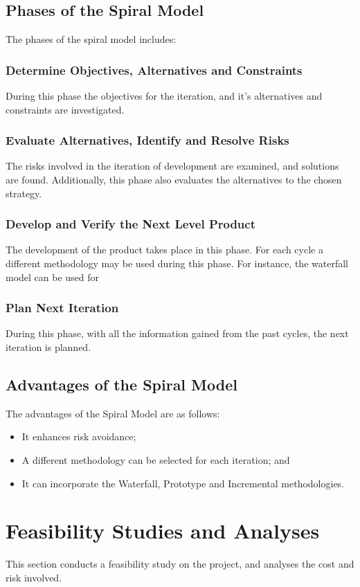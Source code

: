 \subsection{Phases of the Spiral Model}
The phases of the spiral model includes:

\subsubsection{Determine Objectives, Alternatives and Constraints}
During this phase the objectives for the iteration, and it's alternatives and constraints are investigated.

\subsubsection{Evaluate Alternatives, Identify and Resolve Risks}
The risks involved in the iteration of development are examined, and solutions are found. Additionally, this phase also evaluates the alternatives to the chosen strategy.

\subsubsection{Develop and Verify the Next Level Product}
The development of the product takes place in this phase. For each cycle a different methodology may be used during this phase. For instance, the waterfall model can be used for 

\subsubsection{Plan Next Iteration}
During this phase, with all the information gained from the past cycles, the next iteration is planned.

\subsection{Advantages of the Spiral Model}
The advantages of the Spiral Model are as follows:
\begin{itemize}
	\item It enhances risk avoidance;
	\item A different methodology can be selected for each iteration; and 
	\item It can incorporate the Waterfall, Prototype and Incremental methodologies.
\end{itemize}

\section{Feasibility Studies and Analyses}
This section conducts a feasibility study on the project, and analyses  the cost and risk involved.

